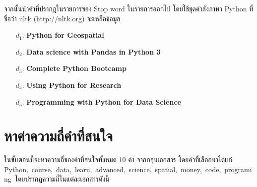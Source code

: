 \documentclass[11pt,a4paper]{article}
\newcommand{\fir}{Python}
\newcommand{\seco}{course}
\newcommand{\thi}{data}
\newcommand{\fou}{learn}
\newcommand{\fif}{advanced}
\newcommand{\six}{science}
\newcommand{\sev}{spatial}
\newcommand{\eig}{money}
\newcommand{\nin}{code}
\newcommand{\ten}{programing}
\begin{document}
    จากนั้นนำคำที่ปรากฎในรายการของ Stop word ในรายการออกไป โดยใช้ชุดคำสั่งภาษา Python ที่ชื่อว่า nltk (http://nltk.org) จะเหลือข้อมูล
    
    \begin{itemize}
        \item[$d_1$:] {\bf Python for Geospatial}  \\
            

        \item[$d_2$:] {\bf Data science with Pandas in Python 3}  \\
            

        \item[$d_3$:] {\bf Complete Python Bootcamp} \\
            

        \item[$d_4$:] {\bf Using Python for Research} \\
            

        \item[$d_5$:] {\bf Programming with Python for Data Science} \\
            
    \end{itemize}

    \section{หาค่าความถี่คำที่สนใจ}
    ในขั้นตอนนี้จะหาความถี่ของคำที่สนใจทั้งหมด 10 คำ จากกลุ่มเอกสาร โดยคำที่เลือกมาได้แก่ \fir,\ \seco,\ \thi,\ \fou,\ \fif,\ \six,\ \sev,\ \eig,\ \nin,\ \ten\ โดยปรากฎความถี่ในแต่ละเอกสารดังนี้
\end{document}
